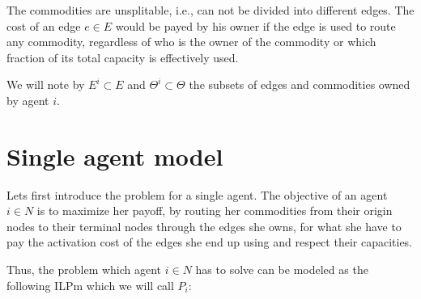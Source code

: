 \documentclass[review]{elsarticle}
\begin{document}
The commodities are unsplitable, i.e., can not be divided into different edges. The cost of an edge $e \in E$ would be payed 
by his owner if the edge is used to route any commodity, regardless of who is the owner of the commodity
or which fraction of its total capacity is effectively used.

We will note by $E^i \subset E$ and $\Theta^i\subset \Theta$ the subsets of edges and commodities owned by agent $i$.

\section{Single agent model}

Lets first introduce the problem for a single agent. The objective of an agent 
$i \in N$ is to maximize her payoff, by routing her commodities from their origin nodes
to their terminal nodes through the edges she owns, for what she have to pay the
activation cost of the edges she end up using and respect their capacities.

Thus, the problem which agent $i\in N$ has to solve can be modeled as the following
ILPm which we will call $P_i$:
\end{document}
